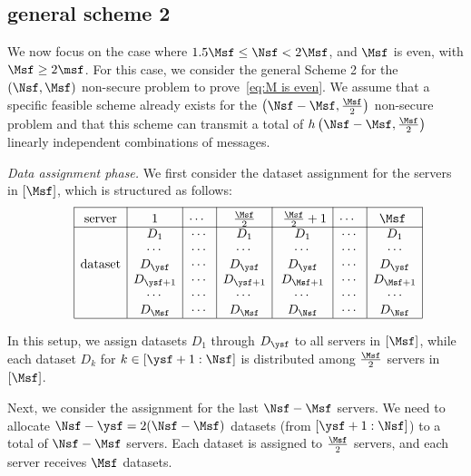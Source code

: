 \documentclass[conference,letterpaper]{IEEEtran}
\begin{document}
\subsection{general scheme 2}
\label{general scheme 2}
We now focus on the case where $1.5 \Msf \leq \Nsf < 2 \Msf$, and $\Msf$ is even, with $\Msf \geq 2\msf$. For this case, we consider the general Scheme 2 for the $(\Nsf, \Msf)$ non-secure problem to prove~\eqref{eq:M is even}. We assume that a specific feasible scheme already exists for the $\left(\Nsf - \Msf, \frac{\Msf}{2}\right)$ non-secure problem and that this scheme can transmit a total of $h\left(\Nsf - \Msf, \frac{\Msf}{2}\right)$ linearly independent combinations of messages.

{\it Data assignment phase.}
We first consider the dataset assignment for the servers in $[\Msf]$, which is structured as follows:
\begin{align*}
\begin{array}{rl|c|c|c|c|c|c|c|}\cline{3-3}\cline{4-4}\cline{5-5}\cline{6-6}\cline{7-7}\cline{8-8}\cline{9-9}
&&\rule{0pt}{1.2em}\mbox{server} & \rule{0pt}{1.2em}\mbox{1} &\rule{0pt}{1.2em}\mbox{$\cdots$ } &  \rule{0pt}{1.2em}\mbox{ $\frac{\Msf}{2}$ } & \rule{0pt}{1.2em}\mbox{ $\frac{\Msf}{2}  +1$}&  \rule{0pt}{1.2em}\mbox{$\cdots$ } &  \rule{0pt}{1.2em}\mbox{$\Msf$ }\\ 
\cline{3-3}\cline{4-4}\cline{5-5}\cline{6-6}\cline{7-7}\cline{8-8}\cline{9-9}
&& &D_1 & \cdots & D_1 & D_1 & \cdots & D_1 \\
&& &\cdots & \cdots & \cdots & \cdots & \cdots & \cdots \\ 
&& \mbox{dataset}&D_{\ysf} & \cdots & D_{\ysf} & D_{\ysf} & \cdots & D_{\ysf} \\
&& &D_{\ysf+1} & \cdots & D_{\ysf+1} & D_{\Msf+1} & \cdots & D_{\Msf+1} \\ 
&& &\cdots & \cdots & \cdots & \cdots & \cdots & \cdots \\
&& &D_{\Msf} & \cdots & D_{\Msf}&  D_{\Nsf} & \cdots & D_{\Nsf}\\  
\cline{3-3}\cline{4-4}\cline{5-5}\cline{6-6}\cline{7-7}\cline{8-8}\cline{9-9}
\end{array}
\end{align*}

In this setup, we assign datasets $D_1$ through $D_{\ysf}$ to all servers in $[\Msf]$, while each dataset $D_k$ for $k \in [\ysf+1 : \Nsf]$ is distributed among $\frac{\Msf}{2}$ servers in $[\Msf]$.

Next, we consider the assignment for the last $\Nsf-\Msf$ servers.
We need to allocate $\Nsf-\ysf = 2(\Nsf-\Msf)$ datasets (from $[\ysf+1 : \Nsf]$) to a total of $\Nsf-\Msf$ servers. Each dataset is assigned to $\frac{\Msf}{2}$ servers, and each server receives $\Msf$ datasets. 
\end{document}
